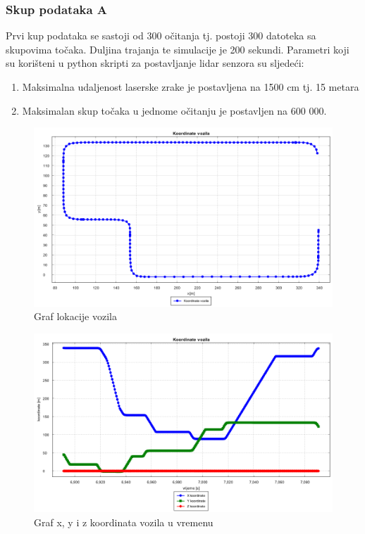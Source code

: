 \subsubsection{Skup podataka A}
Prvi kup podataka se sastoji od 300 očitanja tj. postoji 300 datoteka sa skupovima točaka. Duljina trajanja te simulacije je 200 sekundi. Parametri koji su korišteni u python skripti za postavljanje lidar senzora su sljedeći:
\begin{enumerate}
  \item Maksimalna udaljenost laserske zrake je postavljena na 1500 cm tj. 15 metara
  \item Maksimalan skup točaka u jednome očitanju je postavljen na 600 000.
\end{enumerate}
\begin{figure}[H]
  \includegraphics[scale=0.4]{images/koordinate1.png}
  \caption{Graf lokacije vozila}
  \label{fig:gt1_lokacija}
\end{figure}
\begin{figure}[H]
  \includegraphics[scale=0.4]{images/koordinate_vrijeme1.png}
  \caption{Graf x, y i z koordinata vozila u vremenu}
  \label{fig:gt1_lokacija_koord}
\end{figure}
